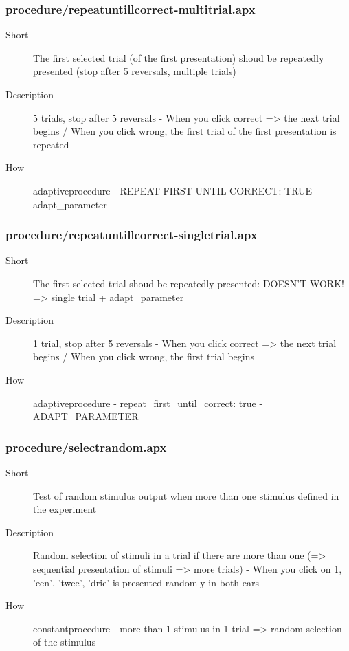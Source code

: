 \subsubsection{procedure/repeatuntillcorrect-multitrial.apx}
\begin{description}
\item[Short] 
 The first selected trial (of the first presentation) shoud be repeatedly presented (stop after 5 reversals, multiple trials)
\item[Description] 
 5 trials, stop after 5 reversals - When you click correct =\textgreater{} the next trial begins / When you click wrong, the first trial of the first presentation is repeated
\item[How] 
 adaptiveprocedure - REPEAT-FIRST-UNTIL-CORRECT: TRUE - adapt\_parameter
\end{description}

\subsubsection{procedure/repeatuntillcorrect-singletrial.apx}
\begin{description}
\item[Short] 
 The first selected trial shoud be repeatedly presented: DOESN'T WORK! =\textgreater{} single trial + adapt\_parameter
\item[Description] 
 1 trial, stop after 5 reversals - When you click correct =\textgreater{} the next trial begins / When you click wrong, the first trial begins
\item[How] 
 adaptiveprocedure - repeat\_first\_until\_correct: true - ADAPT\_PARAMETER
\end{description}

\subsubsection{procedure/selectrandom.apx}
\begin{description}
\item[Short] 
 Test of random stimulus output when more than one stimulus defined in the experiment
\item[Description] 
 Random selection of stimuli in a trial if there are more than one (=\textgreater{} sequential presentation of stimuli =\textgreater{} more trials) - When you click on 1, 'een', 'twee', 'drie' is presented randomly in both ears
\item[How] 
 constantprocedure - more than 1 stimulus in 1 trial =\textgreater{} random selection of the stimulus
\end{description}

